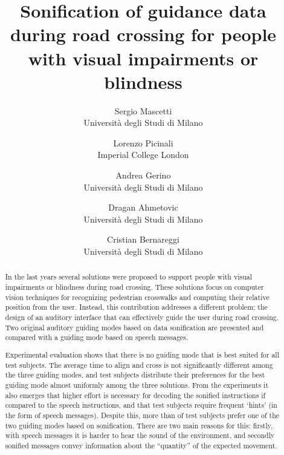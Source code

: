 \documentclass{article}
\title{Sonification of guidance data during road crossing for people with visual impairments or blindness}
\author{Sergio Mascetti\\
\small{Universit\`{a} degli Studi di Milano}\\
\and
Lorenzo Picinali\\
\small{Imperial College London}\\
\and
Andrea Gerino\\
\small{Universit\`{a} degli Studi di Milano}\\
\and
Dragan Ahmetovic\\
\small{Universit\`{a} degli Studi di Milano}\\
\and
Cristian Bernareggi\\
\small{Universit\`{a} degli Studi di Milano}\\
}
\begin{document}
\maketitle







\begin{abstract}
In the last years several solutions were proposed to support people with visual impairments or blindness during road crossing. These solutions focus on computer vision techniques for recognizing pedestrian crosswalks and computing their relative position from the user.
Instead, this contribution addresses a different problem; the design of an auditory interface that can effectively guide the user during road crossing. Two original auditory guiding modes based on data sonification are presented and compared with a guiding mode based on speech messages.

Experimental evaluation shows that there is no guiding mode that is best suited for all test subjects. The average time to align and cross is not significantly different among the three guiding modes, and test subjects distribute their preferences for the best guiding mode almost uniformly among the three solutions.
From the experiments it also emerges that higher effort is necessary for decoding the sonified instructions if compared to the speech instructions, and that test subjects require frequent `hints' (in the form of speech messages).
Despite this, more than  of test subjects prefer one of the two guiding modes based on sonification. There are two main reasons for this: firstly, with speech messages it is harder to hear the sound of the environment, and secondly sonified messages convey information about the ``quantity'' of the expected movement.
\end{abstract}
\end{document}
